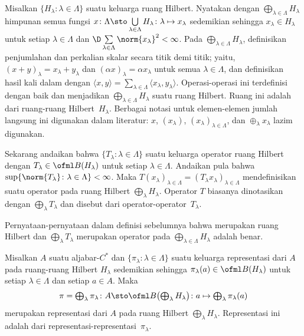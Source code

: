 \begin{defn} Misalkan $\{H_\lambda\colon \lambda \in \Lambda\}$ suatu keluarga ruang Hilbert.
Nyatakan dengan $\bigoplus\limits_{\lambda \in \Lambda} H_\lambda$ himpunan semua fungsi
$x\colon \Lambda \sto \bigcup\limits_{\lambda \in \Lambda} H_\lambda\colon \lambda
\mapsto x_\lambda$ sedemikian sehingga $x_\lambda \in H_\lambda$ untuk setiap $\lambda \in \Lambda$ dan
$\D\sum\limits_{\lambda \in \Lambda} \norm{x_\lambda}^2 < \infty$. Pada
$\bigoplus\limits_{\lambda \in \Lambda} H_\lambda$, definisikan penjumlahan dan perkalian
skalar secara titik demi titik; yaitu, $(x + y)_\lambda = x_\lambda + y_\lambda$ dan $(\alpha
x)_\lambda = \alpha x_\lambda$ untuk semua $\lambda \in \Lambda$, dan definisikan hasil kali dalam
dengan $\langle x,y \rangle = \sum_{\lambda \in \Lambda} \langle x_\lambda,y_\lambda\rangle$.
Operasi-operasi ini terdefinisi dengan baik dan menjadikan $\bigoplus\limits_{\lambda \in \Lambda}
H_\lambda$ suatu ruang Hilbert. Ruang ini adalah
 dari ruang-ruang Hilbert~$H_\lambda$. Berbagai notasi untuk elemen-elemen jumlah
langsung ini digunakan dalam literatur: $x$, $(x_\lambda)$, $(x_\lambda)_{\lambda \in
\Lambda}$, dan $\oplus_\lambda x_\lambda$ lazim digunakan.

Sekarang andaikan bahwa $\{T_\lambda\colon \lambda \in \Lambda\}$ suatu keluarga operator ruang
Hilbert dengan $T_\lambda \in \ofml B(H_\lambda)$ untuk setiap $\lambda \in \Lambda$.
Andaikan pula bahwa $\sup\{\norm{T_\lambda}\colon \lambda \in \Lambda\} < \infty$. Maka
$T(x_\lambda)_{\lambda \in \Lambda} = (T_\lambda x_\lambda)_{\lambda \in \Lambda}$
mendefinisikan suatu operator pada ruang Hilbert $\bigoplus_\lambda H_\lambda$. Operator $T$
biasanya dinotasikan dengan $\bigoplus_\lambda T_\lambda$ dan disebut
 dari operator-operator~$T_\lambda$.
\end{defn}

\begin{prop} Pernyataan-pernyataan dalam definisi sebelumnya bahwa
 merupakan ruang Hilbert dan
$\bigoplus_\lambda T_\lambda$ merupakan operator pada $\bigoplus\limits_{\lambda \in \Lambda}
H_\lambda$ adalah benar.
\end{prop}

\begin{exam} Misalkan $A$ suatu aljabar-$C^*$ dan $\{\pi_\lambda\colon \lambda \in \Lambda\}$ suatu
keluarga representasi dari $A$ pada ruang-ruang Hilbert $H_\lambda$ sedemikian sehingga $\pi_\lambda(a)
\in \ofml B(H_\lambda)$ untuk setiap $\lambda \in \Lambda$ dan setiap $a \in A$. Maka
  \[ \pi = \textstyle{ \bigoplus_\lambda \pi_\lambda\colon A \sto
       \ofml B\bigl(\bigoplus_\lambda H_\lambda\bigr)
       \colon a \mapsto \bigoplus_\lambda \pi_\lambda(a)} \]
merupakan representasi dari $A$ pada ruang Hilbert $\bigoplus_\lambda H_\lambda$. Representasi ini adalah
 dari representasi-representasi~$\pi_\lambda$.
\end{exam}

